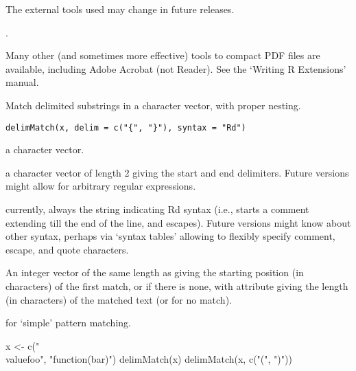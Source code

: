 %
\begin{Note}\relax
The external tools used may change in future releases.
\end{Note}
%
\begin{SeeAlso}\relax
{}.

Many other (and sometimes more effective) tools to compact PDF files
are available, including Adobe Acrobat (not Reader).
See the `Writing R Extensions' manual.
\end{SeeAlso}
%
\begin{Description}\relax
Match delimited substrings in a character vector, with proper nesting.
\end{Description}
%
\begin{Usage}
\begin{verbatim}
delimMatch(x, delim = c("{", "}"), syntax = "Rd")
\end{verbatim}
\end{Usage}
%
\begin{Arguments}
\begin{ldescription}
\item[\code{x}] a character vector.
\item[\code{delim}] a character vector of length 2 giving the start and end
delimiters.  Future versions might allow for arbitrary regular
expressions.
\item[\code{syntax}] currently, always the string  indicating Rd
syntax (i.e., \samp{\%} starts a comment extending till the end of
the line, and \samp{\bsl{}} escapes).  Future versions might know about
other syntax, perhaps via `syntax tables' allowing to
flexibly specify comment, escape, and quote characters.
\end{ldescription}
\end{Arguments}
%
\begin{Value}
An integer vector of the same length as  giving the starting
position (in characters) of the first match, or  if there is
none, with attribute  giving the length (in
characters) of the matched text (or  for no match).
\end{Value}
%
\begin{SeeAlso}\relax
{} for `simple' pattern matching.
\end{SeeAlso}
%
\begin{Examples}
\begin{ExampleCode}
x <- c("\\value{foo}", "function(bar)")
delimMatch(x)
delimMatch(x, c("(", ")"))
\end{ExampleCode}
\end{Examples}
